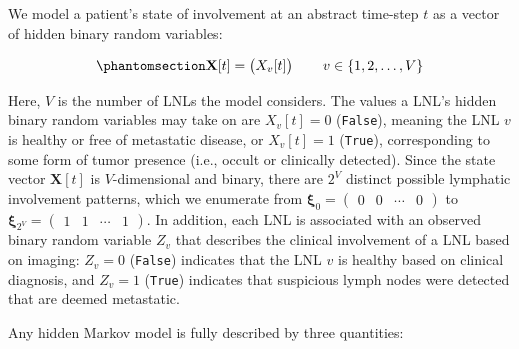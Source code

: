 \documentclass[
  sn-mathphys-num,
]{sn-jnl}
\begin{document}
We model a patient's state of involvement at an abstract time-step \(t\)
as a vector of hidden binary random variables:

\begin{equation}\phantomsection\label{eq-state-def}{
\mathbf{X}[t] = \begin{pmatrix} X_v[t] \end{pmatrix} \qquad v \in \left\{ 1, 2, \ldots, V \right\}
}\end{equation}

Here, \(V\) is the number of LNLs the model considers. The values a
LNL's hidden binary random variables may take on are \(X_v[t] = 0\)
(\texttt{False}), meaning the LNL \(v\) is healthy or free of metastatic
disease, or \(X_v[t] = 1\) (\texttt{True}), corresponding to some form
of tumor presence (i.e., occult or clinically detected). Since the state
vector \(\mathbf{X}[t]\) is \(V\)-dimensional and binary, there are
\(2^V\) distinct possible lymphatic involvement patterns, which we
enumerate from
\(\boldsymbol{\xi}_0 = \begin{pmatrix} 0 & 0 & \cdots & 0 \end{pmatrix}\)
to
\(\boldsymbol{\xi}_{2^V} = \begin{pmatrix} 1 & 1 & \cdots & 1 \end{pmatrix}\).
In addition, each LNL is associated with an observed binary random
variable \(Z_v\) that describes the clinical involvement of a LNL based
on imaging: \(Z_v = 0\) (\texttt{False}) indicates that the LNL \(v\) is
healthy based on clinical diagnosis, and \(Z_v = 1\) (\texttt{True})
indicates that suspicious lymph nodes were detected that are deemed
metastatic.

Any hidden Markov model is fully described by three quantities:
\end{document}
